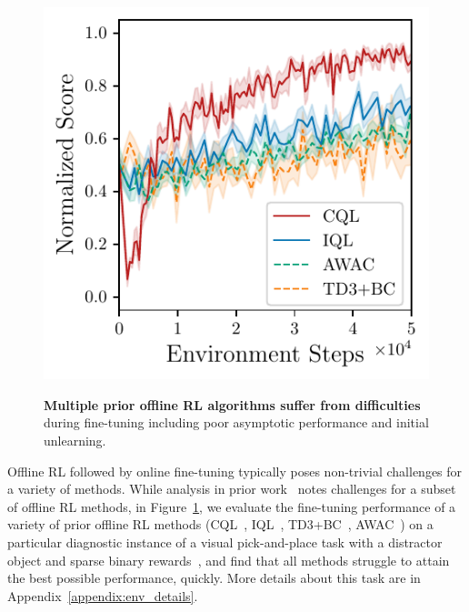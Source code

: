 \begin{figure}
\vspace{-1.2cm}
\begin{center}
{\includegraphics[width=0.75\linewidth]{chapters/cal_ql/figs-sample/sec41-final-utd5.pdf}}
\vspace{-0.3cm}
\caption{\label{fig:cql_iql_finetune}\footnotesize{\textbf{Multiple prior offline RL algorithms suffer from difficulties} during fine-tuning including poor asymptotic performance and initial unlearning.}}
\vspace{-0.5cm}
\end{center}
\end{figure}
Offline RL followed by online fine-tuning typically poses non-trivial challenges for a variety of methods. While analysis in prior work~\citep{nair2020accelerating} notes challenges for a subset of offline RL methods, in Figure~\ref{fig:cql_iql_finetune}, we evaluate the fine-tuning performance of a variety of prior offline RL methods (CQL~\citep{kumar2020conservative}, IQL~\citep{kostrikov2021iql}, TD3+BC~\citep{fujimoto2021minimalist}, AWAC~\citep{nair2020accelerating}) on a particular diagnostic instance of a visual pick-and-place task with a distractor object and sparse binary rewards~\citep{singh2020cog}, and find that all methods struggle to attain the best possible performance, quickly. More details about this task are in Appendix~\ref{appendix:env_details}. 

